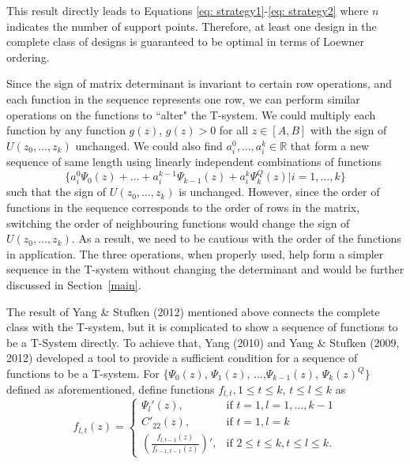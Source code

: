 \documentclass[12pt]{TD-CJS}
\begin{document}
This result directly leads to Equations \eqref{eq: strategy1}-\eqref{eq: strategy2} where $n$ indicates the number of support points. Therefore, at least one design in the complete class of designs is guaranteed to be optimal in terms of Loewner ordering. 

Since the sign of matrix determinant is invariant to certain row operations, and each function in the sequence represents one row, we can perform similar operations on the functions to ``alter" the T-system.  We could multiply each function by any function $g(z)$, $g(z)>0$ for all $z\in [A,B]$ with the sign of $U(z_0,\ldots,z_k)$ unchanged. We could also find $a^0_i,\ldots,a^k_i\in \mathbb{R}$ that form a new sequence of same length using linearly independent combinations of functions \[\{a^0_i\Psi_0(z)+\ldots+a^{k-1}_i\Psi_{k-1}(z)+a^k_i\Psi_k^Q(z) | i=1,\ldots,k\}\] such that the sign of $U(z_0,\ldots,z_k)$ is unchanged. However, since the order of functions in the sequence corresponds to the order of rows in the matrix, switching the order of neighbouring functions would change the sign of $U(z_0,\ldots,z_k)$. As a result, we need to be cautious with the order of the functions in application. The three operations, when properly used, help form a simpler sequence in the T-system without changing the determinant and would be further discussed in Section~\ref{main}.


The result of Yang \& Stufken (2012) mentioned above connects the complete class with the T-system, but it is complicated to show a sequence of functions to be a T-System directly. To achieve that, Yang (2010) and Yang \& Stufken (2009, 2012) developed a tool to provide a sufficient condition for a sequence of functions to be a T-system. For $\{\Psi_0(z)$, $\Psi_1(z)$, $\ldots$,$\Psi_{k-1}(z)$, $\Psi_k(z)^Q\}$ defined as aforementioned, define functions $f_{l,t}, 1\le t \le k$, $t\le l \le k$ as
\begin{equation}
    \label{eq: ff}
f_{l,t}(z) = \left \{ \begin{array}{ll}
\Psi_l'(z), & \text{if } t=1,l=1,...,k-1\\
C'_{22}(z), & \text{if } t=1,l=k\\
(\frac{f_{l,t-1}(z)}{f_{t-1,t-1}(z)})', & \text{if } 2\le t\le k, t\le l \le k.
\end{array}\right.
\end{equation}
\end{document}
